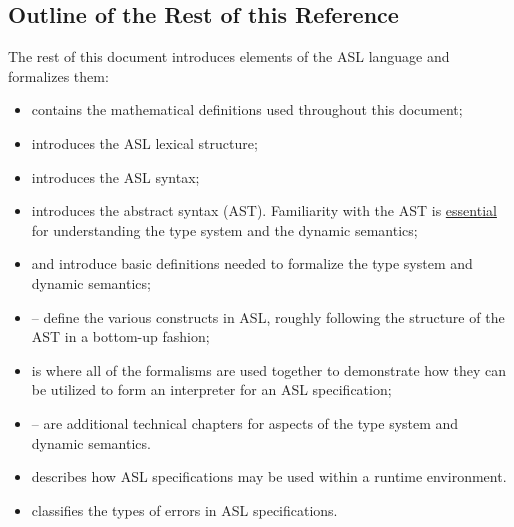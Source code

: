 \subsection{Outline of the Rest of this Reference}
The rest of this document introduces elements of the ASL language
and formalizes them:
\begin{itemize}
    \item {} contains the mathematical definitions used
        throughout this document;
    \item {} introduces the ASL lexical structure;
    \item {} introduces the ASL syntax;
    \item {} introduces the abstract syntax (AST).
        Familiarity with the AST is \underline{essential} for understanding the
        type system and the dynamic semantics;
    \item {} and  introduce basic
        definitions needed to formalize the type system and dynamic semantics;
    \item {}--
        define the various constructs in ASL, roughly following the structure of the AST
        in a bottom-up fashion;
    \item {} is where all of the formalisms are used together to
        demonstrate how they can be utilized to form an interpreter for an ASL specification;
    \item {}-- are additional
        technical chapters for aspects of the type system and dynamic semantics.
    \item {} describes how ASL specifications may be used
        within a runtime environment.
    \item {} classifies the types of errors in ASL specifications.
\end{itemize}
